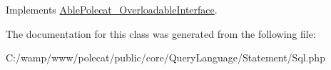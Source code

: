 Implements \hyperlink{interface_able_polecat___overloadable_interface_a94d2e558bba777f54dcc10f1bfc4dca5}{Able\+Polecat\+\_\+\+Overloadable\+Interface}.



The documentation for this class was generated from the following file\+:\begin{DoxyCompactItemize}
\item 
C\+:/wamp/www/polecat/public/core/\+Query\+Language/\+Statement/Sql.\+php\end{DoxyCompactItemize}
